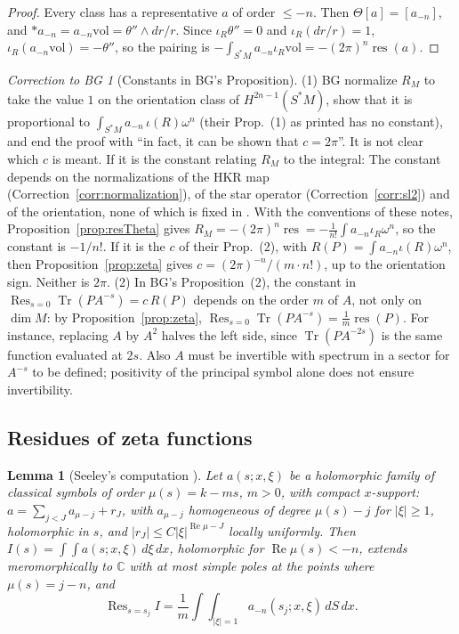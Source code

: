 \documentclass[11pt,oneside,reqno]{article}
\DeclareMathOperator{\Tr}{Tr}
\DeclareMathOperator{\res}{res}
\DeclareMathOperator{\Res}{Res}
\newcommand{\C}{\mathbb C}
\newcommand{\vol}{\mathrm{vol}}
\theoremstyle{plain}
\newtheorem{lemma}[theorem]{Lemma}
\theoremstyle{definition}
\theoremstyle{remark}
\newtheorem{correction}[theorem]{Correction to BG}
\begin{document}
\begin{proof}
Every class has a representative \(a\) of order \(\le-n\). Then \(\Theta[a]=[a_{-n}]\), and
\(*a_{-n}=a_{-n}\vol=\theta''\wedge dr/r\). Since \(\iota_R\theta''=0\) and \(\iota_R(dr/r)=1\),
\(\iota_R(a_{-n}\vol)=-\theta''\), so the pairing is \(-\int_{S^*M}a_{-n}\iota_R\vol=-(2\pi)^n\res(a)\).
\end{proof}

\begin{correction}[Constants in BG's Proposition]\label{corr:zeta}
(1) BG normalize \(R_M\) to take the value \(1\) on the orientation class of
\(H^{2n-1}(S^*M)\), show that it is proportional to \(\int_{S^*M}a_{-n}\,\iota(R)\omega^n\) (their
Prop.~(1) as printed has no constant), and end the proof with ``in fact, it can be
shown that \(c=2\pi\)''. It is not clear which \(c\) is meant. If it is the constant
relating \(R_M\) to the integral: The constant depends on the normalizations of the HKR map
(Correction~\ref{corr:normalization}), of the star operator
(Correction~\ref{corr:sl2}) and of the orientation, none of which is fixed in
\cite{BG}. With the conventions of these notes, Proposition~\ref{prop:resTheta}
gives \(R_M=-(2\pi)^n\res=-\frac1{n!}\int a_{-n}\iota_R\omega^n\), so the constant is \(-1/n!\). If
it is the \(c\) of their Prop.~(2), with \(R(P)=\int a_{-n}\iota(R)\omega^n\), then
Proposition~\ref{prop:zeta} gives \(c=(2\pi)^{-n}/(m\cdot n!)\), up to the orientation sign.
Neither is \(2\pi\).
(2) In BG's Proposition~(2), the constant in \(\Res_{s=0}\Tr(PA^{-s})=c\,R(P)\) depends
on the order \(m\) of \(A\), not only on \(\dim M\): by Proposition~\ref{prop:zeta},
\(\Res_{s=0}\Tr(PA^{-s})=\frac1m\res(P)\). For instance, replacing \(A\) by \(A^2\) halves the
left side, since \(\Tr(PA^{-2s})\) is the same function evaluated at \(2s\). Also \(A\)
must be invertible with spectrum in a sector for \(A^{-s}\) to be defined; positivity
of the principal symbol alone does not ensure invertibility.
\end{correction}

\subsection{Residues of zeta functions}\label{subsec:zeta}

\begin{lemma}[Seeley's computation \cite{Seeley}]\label{lem:seeley}
Let \(a(s;x,\xi)\) be a holomorphic family of classical symbols of order \(\mu(s)=k-ms\),
\(m>0\), with compact \(x\)-support: \(a=\sum_{j<J}a_{\mu-j}+r_J\), with \(a_{\mu-j}\) homogeneous of degree
\(\mu(s)-j\) for \(|\xi|\ge1\), holomorphic in \(s\), and \(|r_J|\le C|\xi|^{\operatorname{Re}\mu-J}\) locally
uniformly. Then \(I(s)=\int\!\!\int a(s;x,\xi)\,d\xi\,dx\), holomorphic for \(\operatorname{Re}\mu(s)<-n\),
extends meromorphically to \(\C\) with at most simple poles at the points where
\(\mu(s)=j-n\), and
\[
 \Res_{s=s_j}I=\frac1m\int\!\!\int_{|\xi|=1}a_{-n}(s_j;x,\xi)\,dS\,dx .
\]
\end{lemma}
\end{document}

